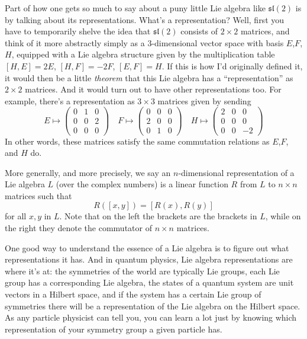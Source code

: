 \documentclass[12pt]{article}
\begin{document}
Part of how one gets so much to say about a puny little Lie algebra like
\(\mathfrak{sl}(2)\) is by talking about its representations. What's a
representation? Well, first you have to temporarily shelve the idea that
\(\mathfrak{sl}(2)\) consists of \(2\times2\) matrices, and think of it
more abstractly simply as a 3-dimensional vector space with basis
\(E\),\(F\),\(H\), equipped with a Lie algebra structure given by the
multiplication table \([H,E] = 2E\), \([H,F] = -2F\), \([E,F] = H\). If
this is how I'd originally defined it, it would then be a little
\emph{theorem} that this Lie algebra has a ``representation'' as
\(2\times2\) matrices. And it would turn out to have other
representations too. For example, there's a representation as
\(3\times3\) matrices given by sending
\[E\mapsto\left(\begin{array}{ccc}0&1&0\\0&0&2\\0&0&0\end{array}\right) \quad F\mapsto\left(\begin{array}{ccc}0&0&0\\2&0&0\\0&1&0\end{array}\right) \quad H\mapsto\left(\begin{array}{ccc}2&0&0\\0&0&0\\0&0&-2\end{array}\right)\]
In other words, these matrices satisfy the same commutation relations as
\(E\),\(F\), and \(H\) do.

More generally, and more precisely, we say an \(n\)-dimensional
representation of a Lie algebra \(L\) (over the complex numbers) is a
linear function \(R\) from \(L\) to \(n\times n\) matrices such that
\[R([x,y]) = [R(x),R(y)]\] for all \(x,y\) in \(L\). Note that on the
left the brackets are the brackets in \(L\), while on the right they
denote the commutator of \(n\times n\) matrices.

One good way to understand the essence of a Lie algebra is to figure out
what representations it has. And in quantum physics, Lie algebra
representations are where it's at: the symmetries of the world are
typically Lie groups, each Lie group has a corresponding Lie algebra,
the states of a quantum system are unit vectors in a Hilbert space, and
if the system has a certain Lie group of symmetries there will be a
representation of the Lie algebra on the Hilbert space. As any particle
physicist can tell you, you can learn a lot just by knowing which
representation of your symmetry group a given particle has.
\end{document}
